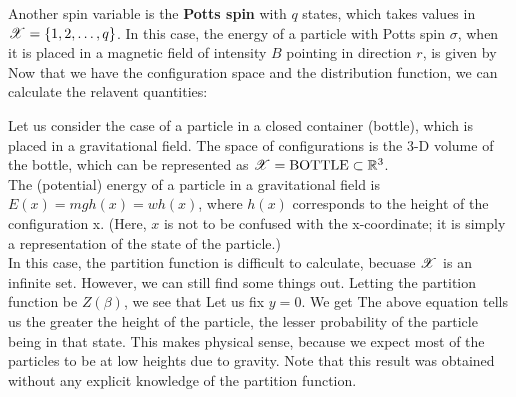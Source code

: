 \documentclass[letterpaper,english,10pt]{article}
\begin{document}
\begin{shaded*} 
\begin{exmp}
Another spin variable is the \textbf{Potts spin} with $q$ states, 
which takes values in $\mathscr{X}=\{1,2,\ldots,q\}$. 
In this case, the energy of a particle with Potts spin $\sigma$, 
when it is placed in a magnetic field of intensity $B$ pointing in direction $r$, is given by 
Now that we have the configuration space and the distribution function, we can calculate the relavent quantities: 
\end{exmp} \end{shaded*}
\begin{shaded*} \begin{exmp}
Let us consider the case of a particle in a closed container (bottle), which is placed in a gravitational field. The space of configurations is the 3-D volume of the bottle, which can be represented as $\mathscr{X}=\text{BOTTLE}\subset \mathbb{R}^3$. \\
The (potential) energy of a particle in a gravitational field is $E(x)=mg h(x)=w h(x)$, where $h(x)$ corresponds to the height of the configuration x. (Here, $x$ is not to be confused with the x-coordinate; it is simply a representation of the state of the particle.) \\
In this case, the partition function is difficult to calculate, becuase $\mathscr{X}$ is an infinite set. However, we can still find some things out. Letting the partition function be $Z(\beta)$, we see that
Let us fix $y=0$. We get 
The above equation tells us the greater the height of the particle, the lesser probability of the particle being in that state. This makes physical sense, because we expect most of the particles to be at low heights due to gravity. Note that this result was obtained without any explicit knowledge of the partition function. 
\end{exmp} \end{shaded*}
\end{document}
